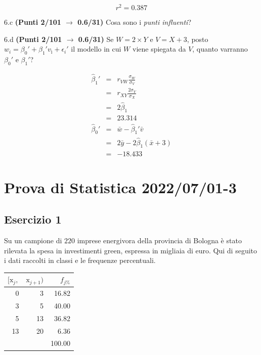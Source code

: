 \documentclass[
  11pt,
]{book}
\theoremstyle{mytheoremstyle}
\theoremstyle{mydefstyle}
\newenvironment{sol}
  {
  \begin{tcolorbox}[enhanced,breakable,arc=0.1mm,boxrule=1pt,colback=white,colframe=iblue,
  title=\bf \fontfamily{lmss}\selectfont \hspace{.5 cm} Soluzione,drop fuzzy shadow]

}{
\end{tcolorbox}
  }
\begin{document}
\[r^2=0.387\]

6.c \textbf{(Punti 2/101 \(\rightarrow\) 0.6/31)} Cosa sono i \emph{punti influenti}?

6.d \textbf{(Punti 2/101 \(\rightarrow\) 0.6/31)} Se \(W=2\times Y\) e \(V=X+3\), posto \(w_i=\beta_0'+\beta_1'v_ì +\epsilon_i'\)
il modello in cui \(W\) viene spiegata da \(V\), quanto varranno \(\beta_0'\) e \(\beta_1'\)?

\begin{sol}
\begin{eqnarray*}
   \hat\beta_1' &=&  r_{VW}\frac{\sigma_W}{\sigma_V} \\
            &=&  r_{XY}\frac{2\sigma_Y}{\sigma_X} \\
            &=& 2\hat\beta_1\\
            &=& 23.314\\
  \hat\beta_0' &=& \bar w - \hat\beta_1'\bar v\\
            &=& 2\bar y-2\hat\beta_1(\bar x + 3)\\
            &=& -18.433
\end{eqnarray*}

\end{sol}

\section{Prova di Statistica 2022/07/01-3}\label{prova-di-statistica-20220701-3}

\subsection{Esercizio 1}\label{esercizio-1-15}

Su un campione di \(220\) imprese energivora della provincia di Bologna è stato
rilevata la spesa in investimenti green, espressa in migliaia di euro. Qui di seguito i dati raccolti in classi
e le frequenze percentuali.

\begin{table}[H]
\centering
\begin{tabular}{rrr}
\toprule
$[\text{x}_j,$ & $\text{x}_{j+1})$ & $f_{j\%}$\\
\midrule
0 & 3 & 16.82\\
3 & 5 & 40.00\\
5 & 13 & 36.82\\
13 & 20 & 6.36\\
 &  & 100.00\\
\bottomrule
\end{tabular}
\end{table}
\end{document}

